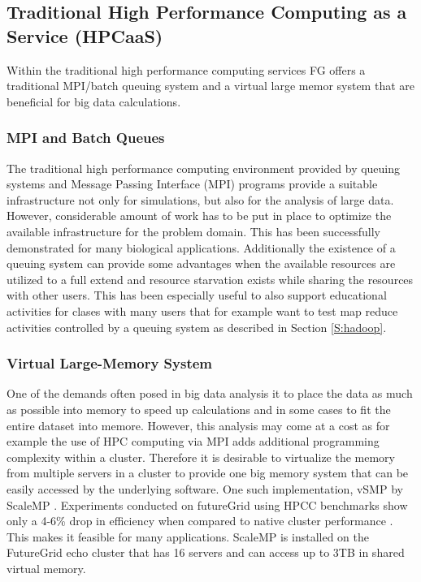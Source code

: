\documentclass{article}
\begin{document}
\subsection{Traditional High Performance Computing as a Service (HPCaaS)}

Within the traditional high performance computing services FG offers a traditional MPI/batch queuing system and a virtual large memor system that are beneficial for big data calculations.

\subsubsection{MPI and Batch Queues}

The traditional high performance computing environment provided by queuing systems and Message Passing Interface (MPI) programs provide a suitable infrastructure not only for simulations, but also for the analysis of large data. However, considerable amount of work has to be put in place to optimize the available infrastructure for the problem domain. This has been successfully demonstrated for many biological applications. Additionally the existence of a queuing system can provide some advantages when the available resources are utilized to a full extend and resource starvation exists while sharing the resources with other users. This has been especially useful to also support educational activities for clases with many users that for example want to test map reduce activities controlled by a queuing system as described in Section \ref{S:hadoop}.

\subsubsection{Virtual Large-Memory System}

One of the demands often posed in big data analysis it to place the data as much as possible into memory to speed up calculations and in some cases to fit the entire dataset into memore. However, this analysis may come at a cost as for example the use of HPC computing via MPI adds additional programming complexity within a cluster. Therefore it is desirable to virtualize the memory from multiple servers in a cluster to provide one big memory system that can be easily accessed by the underlying software. 
One such implementation, vSMP by ScaleMP \cite{www-scalemp}.
Experiments conducted on futureGrid using HPCC
benchmarks show only a 4-6\% drop in efficiency when compared to native
cluster performance \cite{las12fg-bookchapter}. This makes it feasible for many applications. ScaleMP is installed on the FutureGrid echo cluster that has 16 servers and can access up to 3TB in shared virtual memory.
\end{document}
